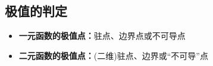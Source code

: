 \subsection{极值的判定}

\begin{itemize}
  \item {\bf 一元函数的极值点：}驻点、边界点或不可导点 
  \item {\bf 二元函数的极值点：}(二维)驻点、边界或“不可导”点 
\end{itemize}

\begin{center}
	\hspace{3cm}

\end{center}
